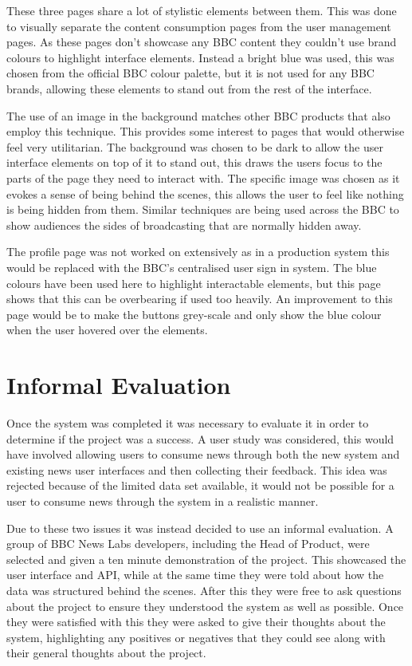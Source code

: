 \documentclass[12pt,titlepage]{article}
\begin{document}
    These three pages share a lot of stylistic elements between them. This was
    done to visually separate the content consumption pages from the user
    management pages. As these pages don't showcase any BBC content they
    couldn't use brand colours to highlight interface elements. Instead a bright
    blue was used, this was chosen from the official BBC colour palette, but it
    is not used for any BBC brands, allowing these elements to stand out from
    the rest of the interface.

    The use of an image in the background matches other BBC products that also
    employ this technique. This provides some interest to pages that would
    otherwise feel very utilitarian. The background was chosen to be dark to
    allow the user interface elements on top of it to stand out, this draws the
    users focus to the parts of the page they need to interact with. The
    specific image was chosen as it evokes a sense of being behind the scenes,
    this allows the user to feel like nothing is being hidden from them.
    Similar techniques are being used across the BBC to show audiences the
    sides of broadcasting that are normally hidden away.

    The profile page was not worked on extensively as in a production system
    this would be replaced with the BBC's centralised user sign in system. The
    blue colours have been used here to highlight interactable elements, but
    this page shows that this can be overbearing if used too heavily. An
    improvement to this page would be to make the buttons grey-scale and only
    show the blue colour when the user hovered over the elements.

\section{Informal Evaluation}

  Once the system was completed it was necessary to evaluate it in order to
  determine if the project was a success. A user study was considered, this would
  have involved allowing users to consume news through both the new system and
  existing news user interfaces and then collecting their feedback. This idea
  was rejected because of the limited data set available, it would not be
  possible for a user to consume news through the system in a realistic manner.

  Due to these two issues it was instead decided to use an informal evaluation.
  A group of BBC News Labs developers, including the Head of Product, were
  selected and given a ten minute demonstration of the project. This showcased
  the user interface and API, while at the same time they were told about how
  the data was structured behind the scenes. After this they were free to ask
  questions about the project to ensure they understood the system as well as
  possible. Once they were satisfied with this they were asked to give their
  thoughts about the system, highlighting any positives or negatives that they
  could see along with their general thoughts about the project.
\end{document}
